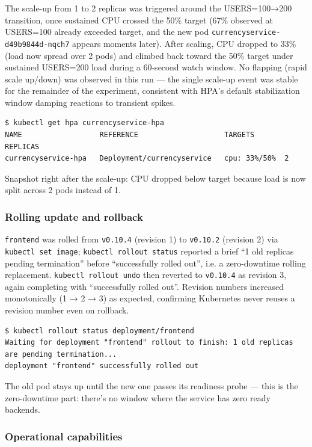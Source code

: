 \documentclass[a4paper,11pt]{article}
\begin{document}
The scale-up from 1 to 2 replicas was triggered around the USERS=100→200 transition, once
sustained CPU crossed the 50\% target (67\% observed at USERS=100 already exceeded target, and
the new pod \texttt{currencyservice-d49b9844d-nqch7} appears moments later). After scaling, CPU
dropped to 33\% (load now spread over 2 pods) and climbed back toward the 50\% target under
sustained USERS=200 load during a 60-second watch window. No flapping (rapid scale up/down) was
observed in this run — the single scale-up event was stable for the remainder of the experiment,
consistent with HPA's default stabilization window damping reactions to transient spikes.

\begin{verbatim}
$ kubectl get hpa currencyservice-hpa
NAME                  REFERENCE                    TARGETS       REPLICAS
currencyservice-hpa   Deployment/currencyservice   cpu: 33%/50%  2
\end{verbatim}
Snapshot right after the scale-up: CPU dropped below target because load is now split across
2 pods instead of 1.

\subsubsection{Rolling update and rollback}

\texttt{frontend} was rolled from \texttt{v0.10.4} (revision 1) to \texttt{v0.10.2} (revision 2) via
\texttt{kubectl set image}; \texttt{kubectl rollout status} reported a brief
``1 old replicas pending termination'' before ``successfully rolled out'', i.e. a zero-downtime
rolling replacement. \texttt{kubectl rollout undo} then reverted to \texttt{v0.10.4} as revision 3,
again completing with ``successfully rolled out''. Revision numbers increased monotonically
(1 → 2 → 3) as expected, confirming Kubernetes never reuses a revision number even on rollback.

\begin{verbatim}
$ kubectl rollout status deployment/frontend
Waiting for deployment "frontend" rollout to finish: 1 old replicas are pending termination...
deployment "frontend" successfully rolled out
\end{verbatim}
The old pod stays up until the new one passes its readiness probe — this is the zero-downtime
part: there's no window where the service has zero ready backends.

\subsubsection{Operational capabilities}
\end{document}
